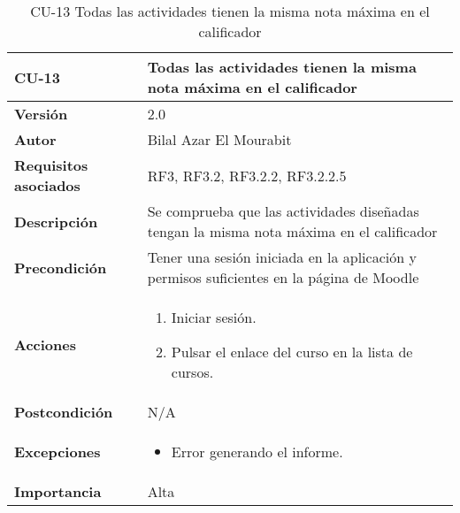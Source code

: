 \begin{table}[H]
	\centering
	\begin{tabularx}{\linewidth}{ p{} p{} }
		\toprule
		\textbf{CU-13}    & \textbf{Todas las actividades tienen la misma nota máxima en el calificador}\\
		\toprule
		\textbf{Versión}              & 2.0    \\
		\textbf{Autor}                & Bilal Azar El Mourabit \\
		\textbf{Requisitos asociados} & RF3, RF3.2, RF3.2.2, RF3.2.2.5 \\
		\textbf{Descripción}          & Se comprueba que las actividades diseñadas tengan la misma nota máxima en el calificador\\
    		\textbf{Precondición}         & Tener una sesión iniciada en la aplicación y permisos suficientes en la página de Moodle \\
		\textbf{Acciones}             & 
		\begin{enumerate}
			\def\labelenumi{\arabic{enumi}.}
			\tightlist
			\item Iniciar sesión.
            \item Pulsar el enlace del curso en la lista de cursos. 
		\end{enumerate}\\
		\textbf{Postcondición}        & N/A \\
		\textbf{Excepciones}          & \begin{itemize}
		    \item Error generando el informe.
		\end{itemize} \\
		\textbf{Importancia}          & Alta \\
		\bottomrule
	\end{tabularx}
	\caption{CU-13 Todas las actividades tienen la misma nota
máxima en el calificador}
\end{table}

